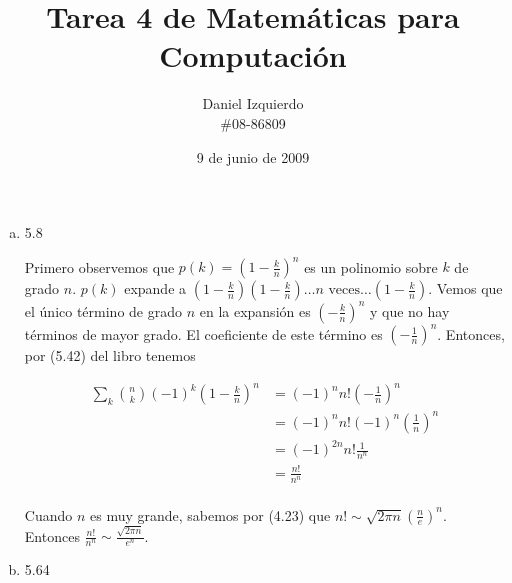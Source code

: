 \documentclass{article}
\begin{document}

\title{Tarea 4 de Matemáticas para Computación}
\author{Daniel Izquierdo \\ \#08-86809}
\date{9 de junio de 2009}

\maketitle

\section{}

\begin{enumerate}[a.]

 \item 5.8

Primero observemos que $p(k) = (1-\frac{k}{n})^n$ es un polinomio sobre $k$ de
grado $n$. $p(k)$ expande a
$(1-\frac{k}{n})(1-\frac{k}{n})\ldots n \text{ veces} \ldots(1-\frac{k}{n})$.
Vemos que el único término de grado $n$ en la expansión es $(-\frac{k}{n})^n$
y que no hay términos de mayor grado. El coeficiente de este término es
$(-\frac{1}{n})^n$. Entonces, por (5.42) del libro tenemos

\begin{align*}
\sum_k \binom{n}{k} (-1)^k (1-\frac{k}{n})^n & = (-1)^n n! (-\frac{1}{n})^n\\
                                             & = (-1)^n n! (-1)^n (\frac{1}{n})^n\\
                                             & = (-1)^{2n} n! \frac{1}{n^n}\\
                                             & = \frac{n!}{n^n}\\
\end{align*}

Cuando $n$ es muy grande, sabemos por (4.23) que $n! \sim \sqrt{2\pi n}(\frac{n}{e})^n$.
Entonces $\frac{n!}{n^n} \sim \frac{\sqrt{2\pi n}}{e^n}$.

 \newpage
 \item 5.64


\end{enumerate}
\end{document}
